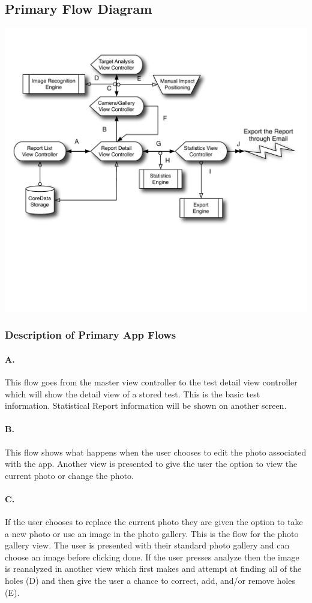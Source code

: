 \subsection{Primary Flow Diagram}
\includegraphics[width=.91\textwidth]{ArchitectureModel20.pdf}

\subsubsection{Description of Primary App Flows}
\paragraph{A.} This flow goes from the master view controller to the test detail view controller which will show the detail view of a stored test. This is the basic test information. Statistical Report information will be shown on another screen.
\paragraph{B.} This flow shows what happens when the user chooses to edit the photo associated with the app. Another view is presented to give the user the option to view the current photo or change the photo.
\paragraph{C.}  If the user chooses to replace the current photo they are given the option to take a new photo or use an image in the photo gallery. This is the flow for the photo gallery view. The user is presented with their standard photo gallery and can choose an image before clicking done. If the user presses analyze then the image is reanalyzed in another view which first makes and attempt at finding all of the holes (D) and then give the user a chance to correct, add, and/or remove holes (E).
